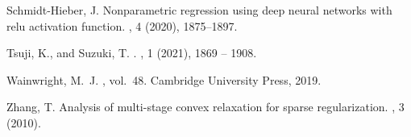 \documentclass[10pt,twoside]{article}
\numberwithin{equation}{section}
\begin{document}
\begin{thebibliography}{10}
{\sc Schmidt-Hieber, J.}
\newblock Nonparametric regression using deep neural networks with relu
  activation function.
, 4 (2020), 1875--1897.

{\sc Tsuji, K., and Suzuki, T.}
.
, 1 (2021), 1869 -- 1908.

{\sc Wainwright, M.~J.}
,
  vol.~48.
\newblock Cambridge University Press, 2019.

{\sc Zhang, T.}
\newblock Analysis of multi-stage convex relaxation for sparse regularization.
, 3 (2010).

\end{thebibliography}
\end{document}
